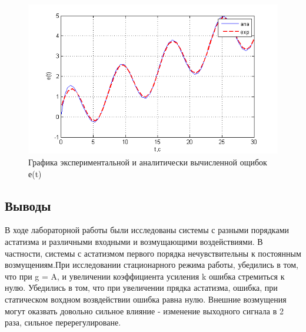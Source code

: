 \documentclass[a4paper, 11pt]{article}
\begin{document}
\begin{center}
	\begin{figure}[ht]
		\centering
			\includegraphics[width=0.7\linewidth]{17}
		\caption{Графика экспериментальной и аналитически вычисленной ощибок е(t)}
		\label{fig:17}
	\end{figure}
\end{center}
\clearpage
\begin{center}
	\section*{Выводы}
\end{center}

В ходе лабораторной работы были исследованы системы с разными порядками астатизма и различными входными и возмущающими воздействиями. В частности, системы с астатизмом первого порядка нечувствительны к постоянным возмущениям.При исследовании стационарного режима работы, убедились в том, что при g = A, и увеличении коэффициента усиления k ошибка стремиться к нулю. 
Убедились в том, что при увеличении прядка астатизма, ошибка, при статическом вохдном возвдействии ошибка равна нулю.
Внешние возмущения могут оказвать довольно сильное влияние - изменение выходного сигнала в 2 раза, сильное перерегулироване.
\end{document}
